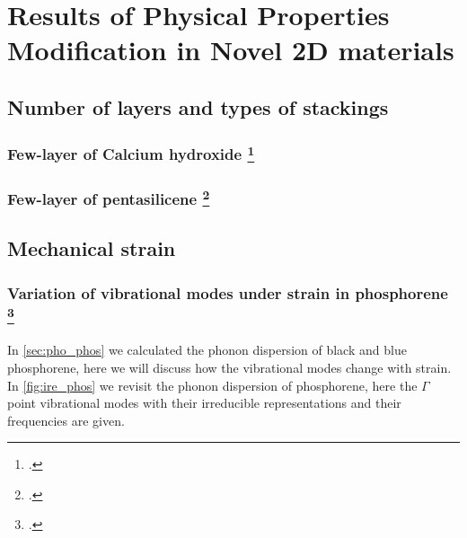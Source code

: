 
\chapter{Results of Physical Properties Modification in Novel 2D materials \label{chap:5}}

\ifpdf
    \graphicspath{{Chapter5/Figs/Raster/}{Chapter5/Figs/PDF/}{Chapter5/Figs/}{Chapter5/Figs/Vector/}}
\else
    \graphicspath{{Chapter5/Figs/Vector/}{Chapter5/Figs/}}
\fi

\section{Number of layers and types of stackings}
\subsection[Few-layer of Calcium hydroxide]{Few-layer of Calcium hydroxide \footcite[This work is published in:][]{Aierken2015.porlandite}}
\subsection[Few-layer of pentasilicene]{Few-layer of pentasilicene \footcite[This work is published in:][]{Aierken2016.pentasilicene}}

\section{Mechanical strain}
\subsection[Variation of vibrational modes under strain in phosphorene]{Variation of vibrational modes under strain in phosphorene \footcite[This work is published in:][]{Aierken2015.thermalP}}

In \autoref{sec:pho_phos} we calculated the phonon dispersion of black and blue phosphorene, here we will discuss how the vibrational modes change with strain. In \autoref{fig:ire_phos} we revisit the phonon dispersion of phosphorene, here the $\Gamma$ point vibrational modes with their irreducible representations and their frequencies are given.

